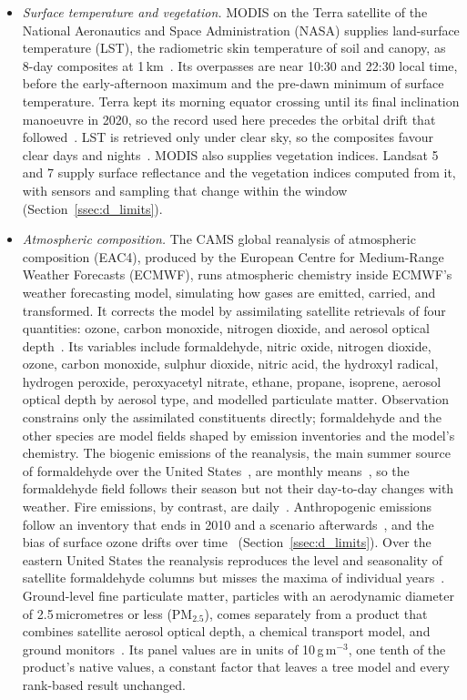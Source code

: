 \documentclass[sensors,article,submit,moreauthors,pdftex]{Definitions/mdpi}
\begin{document}
\begin{itemize}[leftmargin=*, topsep=3pt, itemsep=2pt]
\item \textit{Surface temperature and vegetation.} MODIS on the Terra
satellite of the National Aeronautics and Space Administration (NASA) supplies
land-surface temperature (LST), the radiometric skin temperature of soil and
canopy, as 8-day composites at 1\,km~\cite{Wan2014}. Its overpasses are near
10:30 and 22:30 local time, before the early-afternoon
maximum and the pre-dawn minimum of surface temperature. Terra kept its
morning equator crossing until its final inclination manoeuvre in 2020, so the
record used here precedes the orbital drift that
followed~\cite{NASATerra2022}. LST is retrieved only under clear sky, so the
composites favour clear days and nights~\cite{Ermida2019}. MODIS also supplies
vegetation indices. Landsat 5 and 7 supply surface
reflectance and the vegetation indices computed from it, with sensors and sampling that change within the window (Section~\ref{ssec:d_limits}).
\item \textit{Atmospheric composition.} The CAMS global reanalysis of
atmospheric composition (EAC4), produced by the European Centre for
Medium-Range Weather Forecasts (ECMWF), runs atmospheric chemistry inside
ECMWF's weather forecasting model, simulating how gases are emitted, carried,
and transformed. It corrects
the model by assimilating satellite retrievals of four quantities: ozone,
carbon monoxide, nitrogen dioxide, and aerosol optical
depth~\cite{Inness2019}. Its
variables include formaldehyde, nitric oxide, nitrogen dioxide, ozone, carbon
monoxide, sulphur dioxide, nitric acid, the hydroxyl radical, hydrogen
peroxide, peroxyacetyl nitrate, ethane, propane, isoprene, aerosol optical
depth by aerosol type, and modelled particulate matter. Observation constrains
only the assimilated constituents directly; formaldehyde and the other species
are model fields shaped by emission inventories and the model's chemistry.
The biogenic emissions of the reanalysis, the main
summer source of formaldehyde over the United States~\cite{Millet2008}, are
monthly means~\cite{Inness2019}, so the formaldehyde field follows their season
but not their day-to-day changes with weather. Fire emissions, by contrast,
are daily~\cite{Inness2019}. Anthropogenic emissions follow an inventory that ends in 2010 and a scenario afterwards~\cite{Inness2019}, and the bias of surface ozone drifts over time~\cite{Wagner2021} (Section~\ref{ssec:d_limits}). Over the eastern United States
the reanalysis reproduces the level and seasonality of satellite formaldehyde
columns but misses the maxima of individual years~\cite{Wagner2021}.
Ground-level fine particulate matter, particles
with an aerodynamic diameter of 2.5\,micrometres or less (PM$_{2.5}$), comes separately from a product that
combines satellite aerosol optical depth, a chemical transport model, and
ground monitors~\cite{vanDonkelaar2016, Shen2024}. Its panel values
are in units of 10\,\textmu g\,m$^{-3}$, one tenth of the product's native
values, a constant factor that leaves a tree model and every rank-based result
unchanged.


\end{itemize}
\end{document}
